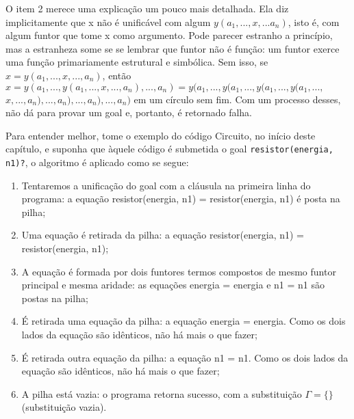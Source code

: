 \documentclass{article}
\theoremstyle{remark}
\theoremstyle{theorem}
\begin{document}
O item 2 merece uma explicação um pouco mais detalhada. Ela diz implicitamente que x não é unificável com algum $y(a_1, ...,x, ...a_n)$, isto é, com algum funtor que tome x como argumento. Pode parecer estranho a princípio, mas a estranheza some se se lembrar que funtor não é função: um funtor exerce uma função primariamente estrutural e simbólica. Sem isso, se $x = y(a_1, ..., x, ..., a_n)$, então $x = y(a_1, ...,y(a_1, ..., x, ..., a_n) , ..., a_n) = y(a_1, ...,y(a_1, ...,y(a_1, ...,y(a_1,
...,$
$x, ..., a_n) , ..., a_n) , ..., a_n) , ..., a_n)$ em um círculo sem fim. Com um processo desses, não dá para provar um goal e, portanto, é retornado falha.

Para entender melhor, tome o exemplo do código Circuito, no início deste capítulo, e suponha que àquele código é submetida o goal {\tt resistor(energia, n1)?}, o algoritmo é aplicado como se segue:

  \begin{enumerate}
    \item Tentaremos a unificação do goal com a cláusula na primeira linha do programa: a equação resistor(energia, n1) = resistor(energia, n1) é posta na pilha;
    \item Uma equação é retirada da pilha: a equação resistor(energia, n1) = resistor(energia, n1);
    \item A equação é formada por dois funtores termos compostos de mesmo funtor principal e mesma aridade: as equações energia  = energia e n1 = n1 são postas na pilha;
    \item É retirada uma equação da pilha: a equação energia = energia. Como os dois lados da equação são idênticos, não há mais o que fazer;
    \item É retirada outra equação da pilha: a equação n1 = n1. Como os dois lados da equação são idênticos, não há mais o que fazer;
    \item A pilha está vazia: o programa retorna sucesso, com a substituição $\Gamma = \{\}$ (substituição vazia).
  \end{enumerate}
\end{document}
